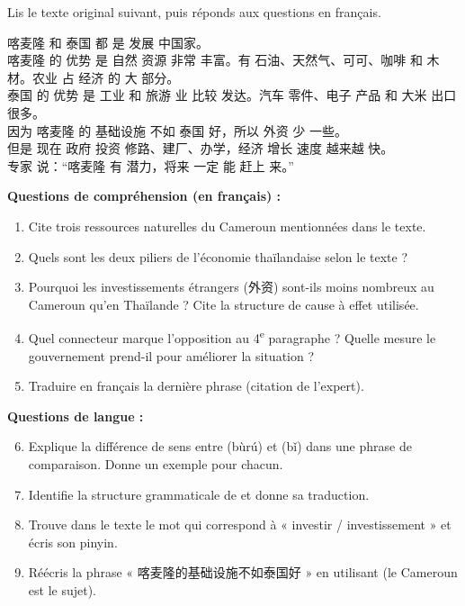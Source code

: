 \documentclass[11pt]{article}
\newcommand{\cle}[1]{{\popxbold\color{popdark}#1}}
\newcommand{\zh}[1]{\ifmmode\text{#1}\else{#1}\fi}
\begin{document}
\begin{exercice}
Lis le texte original suivant, puis réponds aux questions en français.
\begin{textebox}
喀麦隆 和 泰国 都 是 发展 中国家。\\
喀麦隆 的 优势 是 自然 资源 非常 丰富。有 石油、天然气、可可、咖啡 和 木材。农业 占 经济 的 大 部分。\\
泰国 的 优势 是 工业 和 旅游 业 比较 发达。汽车 零件、电子 产品 和 大米 出口 很多。\\
\cle{因为} 喀麦隆 的 基础设施 \cle{不如} 泰国 好，\cle{所以} 外资 少 一些。\\
\cle{但是} 现在 政府 \cle{投资} 修路、建厂、办学，经济 增长 速度 \cle{越来越} 快。\\
专家 说：``喀麦隆 有 潜力，将来 一定 能 赶上 来。''
\end{textebox}
\textbf{Questions de compréhension (en français) :}
\begin{enumerate}
    \item Cite trois ressources naturelles du Cameroun mentionnées dans le texte.
    \item Quels sont les deux piliers de l'économie thaïlandaise selon le texte ?
    \item Pourquoi les investissements étrangers (外资) sont-ils moins nombreux au Cameroun qu'en Thaïlande ? Cite la structure de cause à effet utilisée.
    \item Quel connecteur marque l'opposition au 4\textsuperscript{e} paragraphe ? Quelle mesure le gouvernement prend-il pour améliorer la situation ?
    \item Traduire en français la dernière phrase (citation de l'expert).
\end{enumerate}
\textbf{Questions de langue :}
\begin{enumerate}
    \setcounter{enumi}{5}
    \item Explique la différence de sens entre \zh{不如} (bùrú) et \zh{比} (bǐ) dans une phrase de comparaison. Donne un exemple pour chacun.
    \item Identifie la structure grammaticale de \zh{越来越快} et donne sa traduction.
    \item Trouve dans le texte le mot qui correspond à « investir / investissement » et écris son pinyin.
    \item Réécris la phrase « 喀麦隆的基础设施不如泰国好 » en utilisant \zh{比} (le Cameroun est le sujet).
\end{enumerate}
\end{exercice}
\end{document}

